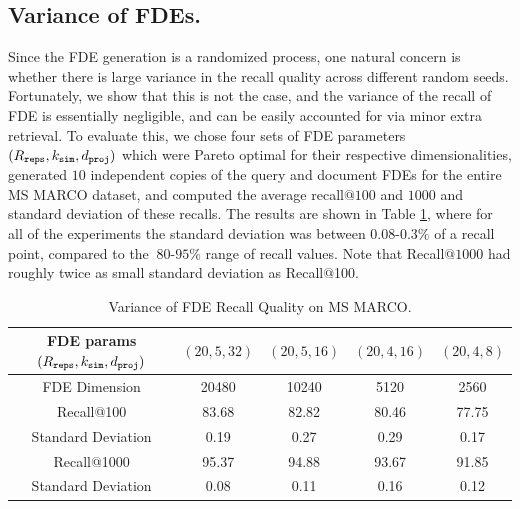 \subsection{Variance of FDEs.} \label{app:variance} Since the FDE generation is a randomized process, one natural concern is whether there is large variance in the recall quality across different random seeds. Fortunately, we show that this is not the case, and the variance of the recall of FDE is essentially negligible, and can be easily accounted for via minor extra retrieval. To evaluate this, we chose four sets of FDE parameters $(R_{\texttt{reps}},k_{\texttt{sim}},d_{\texttt{proj}})$ which were Pareto optimal for their respective dimensionalities, generated $10$ independent copies of the query and document FDEs for the entire MS MARCO dataset, and computed the average recall$@100$ and $1000$ and standard deviation of these recalls. The results are shown in Table \ref{fig:variance}, where for all of the experiments the standard deviation was between $0.08$-$0.3\%$ of a recall point, compared to the $~80$-$95\%$ range of recall values. Note that Recall$@1000$ had roughly twice as small standard deviation as Recall$@$100.

\begin{table}[h!]
    \centering
    \begin{tabular}{|c|c|c|c|c|} %
\hline 
FDE params $(R_{\texttt{reps}},k_{\texttt{sim}},d_{\texttt{proj}})$ &$(20,5,32)$ &  $(20,5,16)$& $(20,  4,16)$ & $(20,4,8)$ \\ %
\hline %
FDE Dimension & 20480 & 10240 & 5120 & 2560 \\
\hline
 Recall@100  & 83.68 & 82.82	&80.46 &	77.75 \\ %
Standard Deviation & 0.19&	0.27	& 0.29&	0.17\\ %
\hline
Recall@1000  & 95.37 & 94.88 & 93.67 & 91.85  \\ %
Standard Deviation & 0.08 & 0.11 & 0.16 & 0.12  \\ %
\hline %
\end{tabular}
\vspace{1em}
  \caption{Variance of FDE Recall Quality on MS MARCO.  }
    \label{fig:variance}
\end{table}




